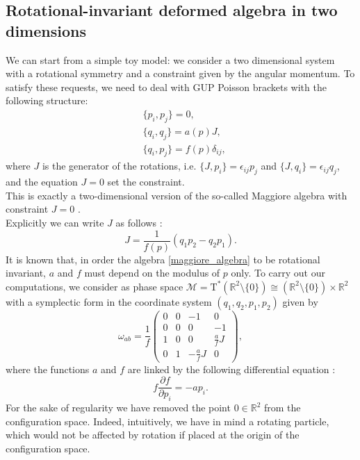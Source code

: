 \documentclass{article}
\numberwithin{equation}{section}
\theoremstyle{definition}
\newcommand{\R}{\mathbb{R}}
\newcommand{\M}{\mathcal{M}}
\newcommand{\T}{\mathrm{T}}
\begin{document}
\subsection{Rotational-invariant deformed algebra in two dimensions}
\label{Sec:2-d}
We can start from a simple toy model: we consider a two dimensional system with a rotational symmetry and a constraint given by the angular momentum. 
To satisfy these requests, we need to deal with GUP Poisson brackets with the following structure:
\begin{equation} \label{maggiore_algebra}
    \begin{split}
        &\{p_i,p_j\}=0, \\
    &\{q_i,q_j\}= a(p)J,\\  &\{q_i,p_j\}= f(p)\delta_{ij},
    \end{split}
\end{equation}
where $J$ is the generator of the rotations, i.e. $\{J,p_i\}=\epsilon_{ij}p_j$ and $\{J,q_i\}=\epsilon_{ij}q_j$, and the equation $J=0$ set the constraint.\\
This is exactly a two-dimensional version of the so-called Maggiore algebra with constraint $J=0$ \cite{Maggiore:1993kv}. \\
Explicitly we can write $J$ as follows \cite{Bruno_Segreto_2024}:
\begin{equation}
    J=\frac{1}{f(p)}(q_1p_2-q_2p_1).
\end{equation}
It is known that, in order the algebra \eqref{maggiore_algebra} to be rotational invariant, $a$ and $f$ must depend on the modulus of $p$ only. To carry out our computations, we consider as phase space $\M=\T^*(\R^2\setminus\{0\})\cong (\R^2\setminus\{0\})\times \R^2$ with a symplectic form in the coordinate system $(q_1,q_2,p_1,p_2)$ given by
\begin{equation}
    \omega_{ab}=\frac{1}{f}\begin{pmatrix}
        0 & 0 & -1 & 0\\
        0 & 0 & 0 & -1\\
        1 & 0 &  0 & \frac{a}{f}J \\
        0 & 1 & -\frac{a}{f}J & 0
    \end{pmatrix},
\end{equation}
where the functions $a$ and $f$ are linked by the following differential equation \cite{Bruno_Segreto_2024}:
\begin{equation}
    f\frac{\partial f}{\partial p_i}=-ap_i.
\end{equation}
For the sake of regularity we have removed the point $0\in \R^2$ from the configuration space. Indeed, intuitively, we have in mind a rotating particle, which would not be affected by rotation if placed at the origin of the configuration space.\\
\end{document}
